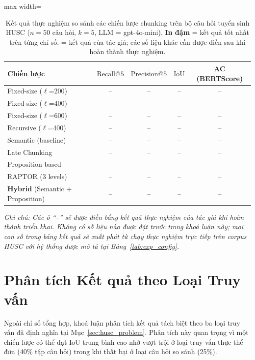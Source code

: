 \documentclass[12pt,a4paper]{report}
\theoremstyle{plain}
\theoremstyle{definition}
\begin{document}
	\begin{table}[htbp]
		\centering
		\caption{Kết quả thực nghiệm so sánh các chiến lược chunking trên bộ câu
			hỏi tuyển sinh HUSC ($n = 50$ câu hỏi, $k = 5$, LLM = gpt-4o-mini).
			\textbf{In đậm} = kết quả tốt nhất trên từng chỉ số.
			\dag{} = kết quả của tác giả; các số liệu khác cần được điền sau khi
			hoàn thành thực nghiệm.}
		\label{tab:main_results}
		\begin{adjustbox}{max width=\linewidth}
			\begin{tabular}{lcccc}
				\toprule
				\textbf{Chiến lược}
				& $\overline{\text{Recall}@5}$
				& $\overline{\text{Precision}@5}$
				& $\overline{\text{IoU}}$
				& \textbf{AC (BERTScore)} \\
				\midrule
				Fixed-size ($\ell$=200)  & -- & -- & -- & -- \\
				Fixed-size ($\ell$=400)  & -- & -- & -- & -- \\
				Fixed-size ($\ell$=600)  & -- & -- & -- & -- \\
				Recursive ($\ell$=400)   & -- & -- & -- & -- \\
				Semantic (baseline)      & -- & -- & -- & -- \\
				Late Chunking            & -- & -- & -- & -- \\
				Proposition-based        & -- & -- & -- & -- \\
				RAPTOR (3 levels)        & -- & -- & -- & -- \\
				\midrule
				\textbf{Hybrid} (Semantic + Proposition) & -- & -- & -- & -- \\
				\bottomrule
			\end{tabular}
		\end{adjustbox}
	\end{table}
	
	\noindent\textit{Ghi chú: Các ô ``--'' sẽ được điền bằng kết quả thực nghiệm
		của tác giả khi hoàn thành triển khai. Không có số liệu nào được đặt trước
		trong khoá luận này; mọi con số trong bảng kết quả sẽ xuất phát từ chạy
		thực nghiệm trực tiếp trên corpus HUSC với hệ thống được mô tả tại
		Bảng~\ref{tab:exp_config}.}
	
	\section{Phân tích Kết quả theo Loại Truy vấn}
	\label{sec:analysis_by_type}
	
	Ngoài chỉ số tổng hợp, khoá luận phân tích kết quả tách biệt theo ba loại
	truy vấn đã định nghĩa tại Mục~\ref{sec:husc_problem}. Phân tích này quan
	trọng vì một chiến lược có thể đạt IoU trung bình cao nhờ vượt trội ở loại
	truy vấn thực thể đơn (40\% tập câu hỏi) trong khi thất bại ở loại câu hỏi
	so sánh (25\%).
	
\end{document}
